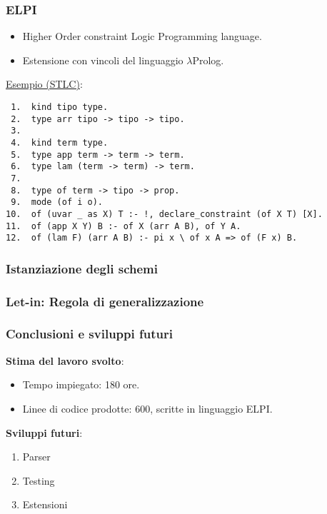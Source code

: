 \documentclass{beamer}
\begin{document}
\begin{frame}[fragile=singleslide]      %

 \frametitle{ELPI}

 \begin{itemize}
  \item Higher Order constraint Logic Programming language.
  \item Estensione con vincoli del linguaggio $\lambda$Prolog.
 \end{itemize}

 \vfill
 
 \underline{Esempio (STLC)}:
 \begin{verbatim}
 1.  kind tipo type.
 2.  type arr tipo -> tipo -> tipo.
 3.
 4.  kind term type.
 5.  type app term -> term -> term.
 6.  type lam (term -> term) -> term.
 7.
 8.  type of term -> tipo -> prop.
 9.  mode (of i o).
10.  of (uvar _ as X) T :- !, declare_constraint (of X T) [X].
11.  of (app X Y) B :- of X (arr A B), of Y A.
12.  of (lam F) (arr A B) :- pi x \ of x A => of (F x) B.
 \end{verbatim}

\end{frame}


\begin{frame}

 \frametitle{Istanziazione degli schemi}


\end{frame}


\begin{frame}

 \frametitle{Let-in: Regola di generalizzazione}


\end{frame}


\begin{frame}

 \frametitle{Conclusioni e sviluppi futuri}

 \textbf{Stima del lavoro svolto}:
 \begin{itemize}
  \item Tempo impiegato: 180 ore.
  \item Linee di codice prodotte: 600, scritte in linguaggio ELPI.
 \end{itemize}

 \vfill

 \textbf{Sviluppi futuri}:
 \begin{enumerate}
  \item Parser
  \item Testing
  \item Estensioni
 \end{enumerate}

\end{frame}
\end{document}
